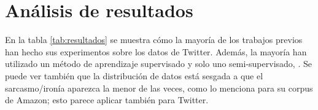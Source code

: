 % 		

\section{Análisis de resultados}

\par En la tabla \ref{tab:resultados} se muestra cómo la mayoría de los trabajos previos han hecho sus experimentos sobre los datos de Twitter. Además, la mayoría han utilizado un método de aprendizaje supervisado y solo uno semi-supervisado, \textcite{davidov2010semi}. Se puede ver también que la distribución de datos está sesgada a que el sarcasmo/ironía aparezca la menor de las veces, como lo menciona \textcite{liu2007low} para su corpus de Amazon; esto parece aplicar también para Twitter.


